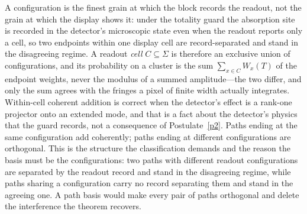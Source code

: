 A configuration is the finest grain at which the block records the readout, not the grain at which the display shows it: under the totality guard the absorption site is recorded in the detector's microscopic state even when the readout reports only a cell, so two endpoints within one display cell are record-separated and stand in the disagreeing regime. A readout \emph{cell} $C \subseteq \Sigma$ is therefore an exclusive union of configurations, and its probability on a cluster is the sum $\sum_{x \in C} W_x(T)$ of the endpoint weights, never the modulus of a summed amplitude---the two differ, and only the sum agrees with the fringes a pixel of finite width actually integrates. Within-cell coherent addition is correct when the detector's effect is a rank-one projector onto an extended mode, and that is a fact about the detector's physics that the guard records, not a consequence of Postulate~\ref{p2}. Paths ending at the same configuration add coherently; paths ending at different configurations are orthogonal. This is the structure the classification demands and the reason the basis must be the configurations: two paths with different readout configurations are separated by the readout record and stand in the disagreeing regime, while paths sharing a configuration carry no record separating them and stand in the agreeing one. A path basis would make every pair of paths orthogonal and delete the interference the theorem recovers.

